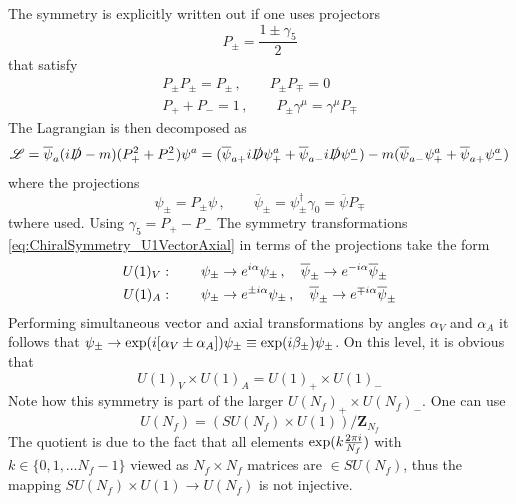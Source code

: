 The symmetry is explicitly written out if one uses projectors
\begin{equation}
    P_\pm=\frac{1\pm\gamma_5}{2}
\end{equation}
that satisfy
\begin{equation}
    \begin{split}
        P_\pm P_\pm=P_\pm\,,\qquad P_\pm P_\mp=0\\
        P_++P_-=1\,,\qquad
        P_\pm\gamma^\mu=\gamma^\mu P_\mp
    \end{split}
\end{equation}
The Lagrangian is then decomposed as
\begin{equation}
    \mathscr{L}=\overline{\psi}_a({i}\slashed{D}-m)(P_+^2+P_-^2)\psi^a=(\overline{\psi}_{a+}{i}\slashed{D}\psi_+^a+\overline{\psi}_{a-}{i}\slashed{D}\psi_-^a)-m(\overline{\psi}_{a-}\psi_+^a+\overline{\psi}_{a+}\psi_-^a)
\end{equation}
where the projections 
\begin{equation}
    \psi_\pm=P_\pm\psi\,,\qquad\overline{\psi}_\pm=\psi^\dagger_\pm\gamma_0=\overline{\psi}P_\mp
\end{equation}
twhere used. Using $\gamma_5=P_+-P_-$ The symmetry transformations \eqref{eq:ChiralSymmetry_U1VectorAxial} in terms of the projections take the form
\begin{subequations}
    \begin{align}
        U(1)_V & :\qquad \psi_\pm\to e^{{i}\alpha}\psi_\pm\,,\quad\overline{\psi}_\pm\to e^{-{i}\alpha}\overline{\psi}_\pm      \\
        U(1)_A & :\qquad \psi_\pm\to e^{\pm{i}\alpha}\psi_\pm\,,\quad\overline{\psi}_\pm\to e^{\mp{i}\alpha}\overline{\psi}_\pm
    \end{align}
\end{subequations}
Performing simultaneous vector and axial transformations by angles $\alpha_V$ and $\alpha_A$ it follows that $\psi_\pm\to\exp({i}[\alpha_V\pm\alpha_A])\psi_\pm\equiv\exp({i}\beta_\pm)\psi_\pm$. On this level, it is obvious that
\begin{equation}
    U(1)_V\times U(1)_A=U(1)_+\times U(1)_-
\end{equation}
Note how this symmetry is part of the larger $U(N_f)_+\times U(N_f)_-$. One can use
\begin{equation}
    U(N_f)=(SU(N_f)\times U(1))/\mathbf{Z}_{N_f}
\end{equation}
The quotient is due to the fact that all elements $\exp(k\frac{2\pi{i}}{N_f})$ with $k\in\{0,1,\dots N_f-1\}$ viewed as $N_f\times N_f$ matrices are $\in SU(N_f)$, thus the mapping $SU(N_f)\times U(1)\to U(N_f)$ is not injective.
